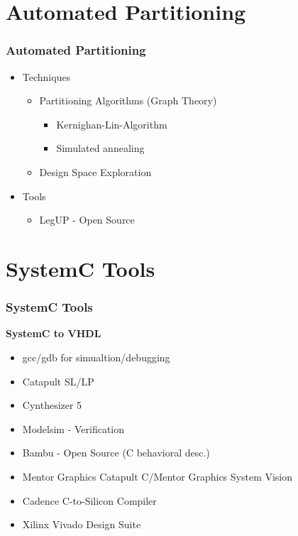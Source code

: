 \documentclass{beamer}
\begin{document}
\section{Automated Partitioning}
\begin{frame}\frametitle{Automated Partitioning} 

\begin{itemize}
  \item Techniques
  \begin{itemize}
   \item Partitioning Algorithms (Graph Theory)
    \begin{itemize}
      \item{Kernighan-Lin-Algorithm}
      \item{Simulated annealing}  
    \end{itemize}
   \item Design Space Exploration
  \end{itemize}
  
  \item{Tools}
    \begin{itemize}
   \item{LegUP - Open Source}
    \end{itemize}
 \end{itemize}
\end{frame}


\section{SystemC Tools}
\begin{frame}\frametitle{SystemC Tools} 
\textbf{SystemC to VHDL}
    \begin{itemize}
      \item{gcc/gdb for simualtion/debugging}
      \item{Catapult SL/LP}
      \item{Cynthesizer 5}
      \item{Modelsim - Verification}
      \item{Bambu - Open Source (C behavioral desc.)}
      \item{Mentor Graphics Catapult C/Mentor Graphics System Vision}
      \item{Cadence C-to-Silicon Compiler}
      \item{Xilinx Vivado Design Suite}
    \end{itemize}
\end{frame}
\end{document}
